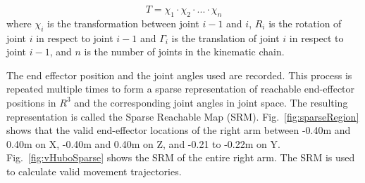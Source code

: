 \begin{equation}\label{eq:fk2}
T = \chi_1 \cdot \chi_2 \cdot ... \cdot \chi_n
\end{equation}
where $\chi_i$ is the transformation between joint $i-1$ and $i$, $R_i$ is the rotation of joint $i$ in respect to joint $i-1$ and $\Gamma_i$ is the translation of joint $i$ in respect to joint $i-1$, and $n$ is the number of joints in the kinematic chain.

The end effector position and the joint angles used are recorded.  This process is repeated multiple times to form a sparse representation of reachable end-effector positions in $R^3$ and the corresponding joint angles in joint space.  The resulting representation is called the Sparse Reachable Map (SRM).  Fig.~\ref{fig:sparseRegion} shows that the valid end-effector locations of the right arm between -0.40m and 0.40m on X, -0.40m and 0.40m on Z, and -0.21 to -0.22m on Y.  Fig.~\ref{fig:vHuboSparse} shows the SRM of the entire right arm.  The SRM is used to calculate valid movement trajectories.


